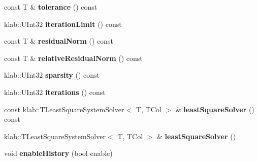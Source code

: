 \begin{DoxyCompactItemize}
\item 
const T \& {\bfseries tolerance} () const \hypertarget{classkl1p_1_1TOMPSolver_a1ee5e5df83afc06a1f6ec5321aaf7b28}{}\label{classkl1p_1_1TOMPSolver_a1ee5e5df83afc06a1f6ec5321aaf7b28}

\item 
klab\+::\+U\+Int32 {\bfseries iteration\+Limit} () const \hypertarget{classkl1p_1_1TOMPSolver_a8cd9df3ec2ad85057860ff8e43c3841a}{}\label{classkl1p_1_1TOMPSolver_a8cd9df3ec2ad85057860ff8e43c3841a}

\item 
const T \& {\bfseries residual\+Norm} () const \hypertarget{classkl1p_1_1TOMPSolver_a204d8d18c8a616ba3103613129cd5a29}{}\label{classkl1p_1_1TOMPSolver_a204d8d18c8a616ba3103613129cd5a29}

\item 
const T \& {\bfseries relative\+Residual\+Norm} () const \hypertarget{classkl1p_1_1TOMPSolver_a6b86902cd6e3b13d7129de355fe10691}{}\label{classkl1p_1_1TOMPSolver_a6b86902cd6e3b13d7129de355fe10691}

\item 
klab\+::\+U\+Int32 {\bfseries sparsity} () const \hypertarget{classkl1p_1_1TOMPSolver_a6c37acf01b54687e0cdb72506d43f1cf}{}\label{classkl1p_1_1TOMPSolver_a6c37acf01b54687e0cdb72506d43f1cf}

\item 
klab\+::\+U\+Int32 {\bfseries iterations} () const \hypertarget{classkl1p_1_1TOMPSolver_a28a59ae042ed628308034f687f87c648}{}\label{classkl1p_1_1TOMPSolver_a28a59ae042ed628308034f687f87c648}

\item 
const klab\+::\+T\+Least\+Square\+System\+Solver$<$ T, T\+Col $>$ \& {\bfseries least\+Square\+Solver} () const \hypertarget{classkl1p_1_1TOMPSolver_a9398490fac54be0c27aba7fd54b6f91a}{}\label{classkl1p_1_1TOMPSolver_a9398490fac54be0c27aba7fd54b6f91a}

\item 
klab\+::\+T\+Least\+Square\+System\+Solver$<$ T, T\+Col $>$ \& {\bfseries least\+Square\+Solver} ()\hypertarget{classkl1p_1_1TOMPSolver_aafdfdc48fe4c87e1f457045cbdee7f31}{}\label{classkl1p_1_1TOMPSolver_aafdfdc48fe4c87e1f457045cbdee7f31}

\item 
void {\bfseries enable\+History} (bool enable)\hypertarget{classkl1p_1_1TOMPSolver_a75c1a6c707ce50d4403e02bd99a5f92e}{}\label{classkl1p_1_1TOMPSolver_a75c1a6c707ce50d4403e02bd99a5f92e}


\end{DoxyCompactItemize}
